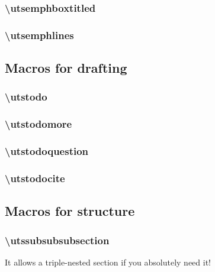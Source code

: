 \subsubsection{\textbackslash utsemphboxtitled}


\subsubsection{\textbackslash utsemphlines}




\subsection{Macros for drafting}

\subsubsection{\textbackslash utstodo}


\subsubsection{\textbackslash utstodomore}
\utstodomore


\subsubsection{\textbackslash utstodoquestion}


\subsubsection{\textbackslash utstodocite}
\utstodocite 




\subsection{Macros for structure}
\subsubsection{\textbackslash utssubsubsubsection}
It allows a triple-nested section if you absolutely need it!

